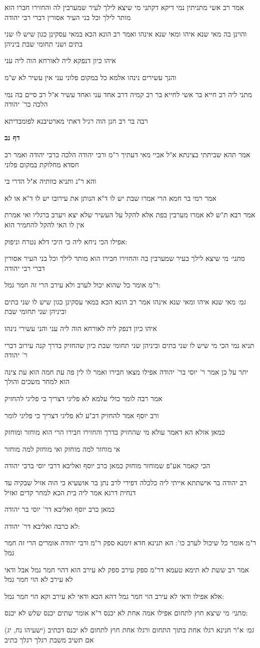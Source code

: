 \documentclass[12pt, openany]{book}
\newcommand{\sethebfont}{
\fontsize{10.5pt}{21.0pt} \selectfont
}
\newcommand{\textblock}[1]{
{\sethebfont #1\\}	
}
\newcommand{\sectname}{}
\newcommand{\newsection}[1]{
	\addcontentsline{toc}{section}{#1}
	\renewcommand{\sectname}{#1}	
	\vspace{-\baselineskip}
	\begin{center}
		\textbf{%
\fontsize{16pt}{16pt}\selectfont
			#1}
	\end{center}
	\vspace{-\baselineskip}
	\nopagebreak
}
\begin{document}
\textblock{אמר רב אשי מתניתין נמי דיקא דקתני מי שיצא לילך לעיר שמערבין לה והחזירו חברו הוא מותר לילך וכל בני העיר אסורין דברי רבי יהודה}
\textblock{והוינן בה מאי שנא איהו ומאי שנא אינהו ואמר רב הונא הכא במאי עסקינן כגון שיש לו שני בתים ושני תחומי שבת ביניהן}
\textblock{איהו כיון דנפקא ליה לאורחא הוה ליה עני}
\textblock{והנך עשירים נינהו אלמא כל במקום פלוני עני אין עשיר לא ש"מ}
\textblock{מתני ליה רב חייא בר אשי לחייא בר רב קמיה דרב אחד עני ואחד עשיר א"ל רב סיים בה נמי הלכה כר' יהודה}
\textblock{רבה בר רב חנן הוה רגיל דאתי מארטיבנא לפומבדיתא}
\newsection{דף נב}
\textblock{אמר תהא שביתתי בצינתא א"ל אביי מאי דעתיך ר"מ ורבי יהודה הלכה כרבי יהודה ואמר רב חסדא מחלוקת במקום פלוני}
\textblock{והא ר"נ ותניא כוותיה א"ל הדרי בי}
\textblock{אמר רמי בר חמא הרי אמרו שבת יש לו ד"א הנותן את עירובו יש לו ד"א או לא}
\textblock{אמר רבא ת"ש לא אמרו מערבין בפת אלא להקל על העשיר שלא יצא ויערב ברגליו ואי אמרת אין לו האי להקל להחמיר הוא}
\textblock{אפילו הכי ניחא ליה כי היכי דלא נטרח וניפוק:}
\textblock{{\large\emph{מתני׳}} מי שיצא לילך בעיר שמערבין בה והחזירו חבירו הוא מותר לילך וכל בני העיר אסורין דברי רבי יהודה}
\textblock{ר"מ אומר כל שהוא יכול לערב ולא עירב הרי זה חמר גמל:}
\textblock{{\large\emph{גמ׳}} מאי שנא איהו ומאי שנא אינהו אמר רב הונא הכא במאי עסקינן כגון שיש לו שני בתים וביניהן שני תחומי שבת}
\textblock{איהו כיון דנפק ליה לאורחא הוה ליה עני והני עשירי נינהו}
\textblock{תניא נמי הכי מי שיש לו שני בתים וביניהן שני תחומי שבת כיון שהחזיק בדרך קנה עירוב דברי ר' יהודה}
\textblock{יתר על כן אמר ר' יוסי בר' יהודה אפילו מצאו חבירו ואמר לו לין פה עת חמה הוא עת צינה הוא למחר משכים והולך}
\textblock{אמר רבה לומר כולי עלמא לא פליגי דצריך כי פליגי להחזיק}
\textblock{ורב יוסף אמר להחזיק דכ"ע לא פליגי דצריך כי פליגי לומר}
\textblock{כמאן אזלא הא דאמר עולא מי שהחזיק בדרך והחזירו חבירו הרי הוא מוחזר ומוחזק}
\textblock{אי מוחזר למה מוחזק ואי מוחזק למה מוחזר}
\textblock{הכי קאמר אע"פ שמוחזר מוחזק כמאן כרב יוסף ואליבא דרבי יוסי ברבי יהודה}
\textblock{רב יהודה בר אישתתא אייתי ליה כלכלה דפירי לרב נתן בר אושעיא כי הוה אזיל שבקיה עד דנחית דרגא אמר ליה בית הכא למחר קדים ואזיל}
\textblock{כמאן כרב יוסף ואליבא דר' יוסי בר יהודה}
\textblock{לא כרבה ואליבא דר' יהודה:}
\textblock{ר"מ אומר כל שיכול לערב כו': הא תנינא חדא זימנא ספק ר"מ ורבי יהודה אומרים הרי זה חמר גמל}
\textblock{אמר רב ששת לא תימא טעמא דר"מ ספק עירב ספק לא עירב הוא דהוי חמר גמל אבל ודאי לא עירב לא הוי חמר גמל}
\textblock{אלא אפילו ודאי לא עירב הוי חמר גמל דהא הכא ודאי לא עירב וקא הוי חמר גמל:}
\textblock{{\large\emph{מתני׳}} מי שיצא חוץ לתחום אפילו אמה אחת לא יכנס ר"א אומר שתים יכנס שלש לא יכנס:}
\textblock{{\large\emph{גמ׳}} א"ר חנינא רגלו אחת בתוך התחום ורגלו אחת חוץ לתחום לא יכנס דכתיב (ישעיהו נח, יג) אם תשיב משבת רגלך רגלך כתיב}
\end{document}
